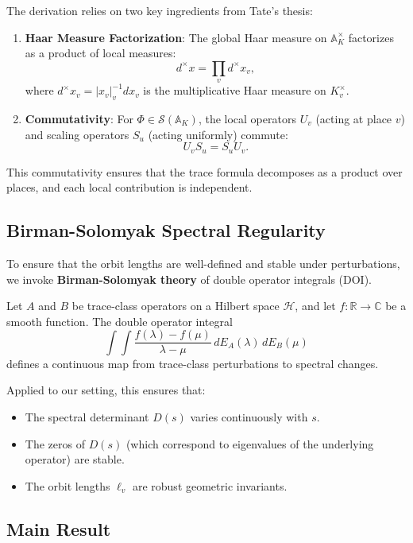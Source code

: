 The derivation relies on two key ingredients from Tate's thesis:

\begin{enumerate}
  \item \textbf{Haar Measure Factorization}: The global Haar measure on $\mathbb{A}_K^\times$ factorizes as a product of local measures:
  \[
  d^\times x = \prod_v d^\times x_v,
  \]
  where $d^\times x_v = |x_v|_v^{-1} dx_v$ is the multiplicative Haar measure on $K_v^\times$.
  
  \item \textbf{Commutativity}: For $\Phi \in \mathcal{S}(\mathbb{A}_K)$, the local operators $U_v$ (acting at place $v$) and scaling operators $S_u$ (acting uniformly) commute:
  \[
  U_v S_u = S_u U_v.
  \]
\end{enumerate}

This commutativity ensures that the trace formula decomposes as a product over places, and each local contribution is independent.

\subsection{Birman-Solomyak Spectral Regularity}

To ensure that the orbit lengths are well-defined and stable under perturbations, we invoke \textbf{Birman-Solomyak theory} \cite{birman2003} of double operator integrals (DOI).

\begin{lemma}
Let $A$ and $B$ be trace-class operators on a Hilbert space $\mathcal{H}$, and let $f: \mathbb{R} \to \mathbb{C}$ be a smooth function. The double operator integral
\[
\int \int \frac{f(\lambda) - f(\mu)}{\lambda - \mu} \, dE_A(\lambda) \, dE_B(\mu)
\]
defines a continuous map from trace-class perturbations to spectral changes.
\end{lemma}

Applied to our setting, this ensures that:
\begin{itemize}
  \item The spectral determinant $D(s)$ varies continuously with $s$.
  \item The zeros of $D(s)$ (which correspond to eigenvalues of the underlying operator) are stable.
  \item The orbit lengths $\ell_v$ are robust geometric invariants.
\end{itemize}

\subsection{Main Result}

